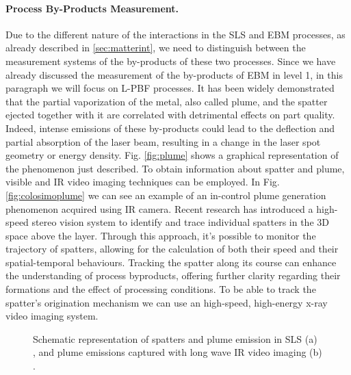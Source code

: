 \paragraph{Process By-Products Measurement.} Due to the different nature of the interactions in the SLS and EBM processes, as already described in \ref{sec:matterint}, we need to distinguish between the measurement systems of the by-products of these two processes. Since we have already discussed the measurement of the by-products of EBM in level 1, in this paragraph we will focus on L-PBF processes. It has been widely demonstrated that the partial vaporization of the metal, also called plume, and the spatter ejected together with it are correlated with detrimental effects on part quality. Indeed, intense emissions of these by-products could lead to the deflection and partial absorption of the laser beam, resulting in a change in the laser spot geometry or energy density. Fig. \ref{fig:plume} shows a graphical representation of the phenomenon just described. To obtain information about spatter and plume, visible and IR video imaging techniques can be employed. In Fig. \ref{fig:colosimoplume} we can see an example of an in-control plume generation phenomenon acquired using IR camera. Recent research has introduced a high-speed stereo vision system to identify and trace individual spatters in the 3D space above the layer. Through this approach, it's possible to monitor the trajectory of spatters, allowing for the calculation of both their speed and their spatial-temporal behaviours. Tracking the spatter along its course can enhance the understanding of process byproducts, offering further clarity regarding their formations and the effect of processing conditions. To be able to track the spatter's origination mechanism we can use an high-speed, high-energy x-ray video imaging system.
\begin{figure}
    \centering
    \qquad
    \caption[Spatters and plume in SLS]{Schematic representation of spatters and plume emission in SLS (a) \cite{grasso_-situ_2021}, and plume emissions captured with long wave IR video imaging (b) \cite{grasso_statistical_2019}.}
    
\end{figure}

